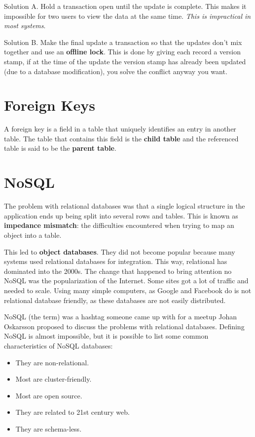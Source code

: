 \documentclass[oneside]{book} %
\theoremstyle{plain}
\begin{document}
Solution A. Hold a transaction open until the update is complete. This makes it
impossible for two users to view the data at the same time. \textit{This is
impractical in most systems}.

Solution B. Make the final update a transaction so that the updates don't mix
together and use an \textbf{offline lock}. This is done by giving each record a
version stamp, if at the time of the update the version stamp has already been
updated (due to a database modification), you solve the conflict anyway you
want.

\section{Foreign Keys}
A foreign key is a field in a table that uniquely identifies an entry in another
table. The table that contains this field is the \textbf{child table} and the
referenced table is said to be the \textbf{parent table}.

\section{NoSQL}
The problem with relational databases was that a single logical structure in the
application ends up being split into several rows and tables. This is known as
\textbf{impedance mismatch}: the difficulties encountered when trying to map
an object into a table.

This led to \textbf{object databases}. They did not become popular because many
systems used relational databases for integration. This way, relational has
dominated into the 2000s. The change that happened to bring attention no NoSQL
was the popularization of the Internet. Some sites got a lot of traffic and
needed to scale. Using many simple computers, as Google and Facebook do is not
relational database friendly, as these databases are not easily distributed.

NoSQL (the term) was a hashtag someone came up with for a meetup Johan
Oskarsson proposed to discuss the problems with relational databases. Defining
NoSQL is almost impossible, but it is possible to list some common
characteristics of NoSQL databases:
\begin{itemize}
 \item They are non-relational.
 \item Most are cluster-friendly.
 \item Most are open source.
 \item They are related to 21st century web.
 \item They are schema-less.
\end{itemize}
\end{document}
